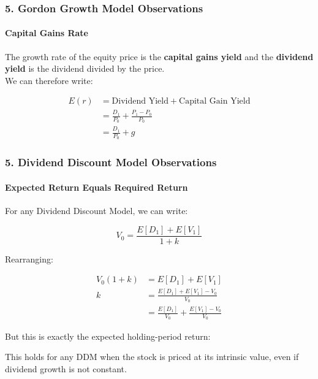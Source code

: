 \documentclass{beamer}
\begin{document}
\begin{frame}[t]
    \frametitle{5. Gordon Growth Model Observations}
    \framesubtitle{Capital Gains Rate}

    The growth rate of the equity price is the \textbf{capital gains yield} and the 
    \textbf{dividend yield} is the dividend divided by the price.\\

    We can therefore write:

    \begin{align*}
        E(r) &= \text{Dividend Yield} + \text{Capital Gain Yield}\\
             &= \frac{D_1}{P_0} + \frac{P_1 - P_0}{P_0}\\
             &= \frac{D_1}{P_0} + g
    \end{align*} 


\end{frame}

\begin{frame}[t]
    \frametitle{5. Dividend Discount Model Observations}
    \framesubtitle{Expected Return Equals Required Return}

    For any Dividend Discount Model, we can write:

    \[
    V_0 = \frac{E[D_1]+E[V_1]}{1+k}
    \]

    Rearranging:

    {\footnotesize
    \begin{align*}
        V_0(1+k) &= E[D_1]+E[V_1]\\
        k &= \frac{E[D_1]+E[V_1]-V_0}{V_0}\\
          &= \frac{E[D_1]}{V_0}
          +\frac{E[V_1]-V_0}{V_0}
    \end{align*}
     }
 
    But this is exactly the expected holding-period return: 


    This holds for any DDM when the stock is priced at its
    intrinsic value, even if dividend growth is not constant.

\end{frame}
\end{document}
